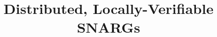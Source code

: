 \documentclass[acm]{acmart}
\begin{document}
\title{Distributed, Locally-Verifiable SNARGs}





%
%
%
%
%
%
%
%

%
%




%



%
%
%

%
\end{document}
